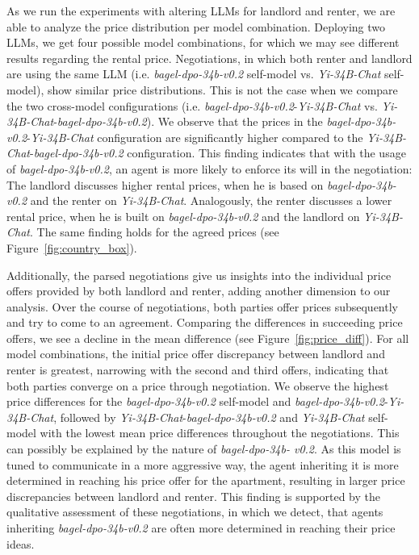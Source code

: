 \documentclass[runningheads]{llncs}
\begin{document}
As we run the experiments with altering LLMs for landlord and renter, we are able to analyze the price distribution per model combination. Deploying two LLMs, we get four possible model combinations, for which we may see different results regarding the rental price. Negotiations, in which both renter and landlord are using the same LLM (i.e. \textit{bagel-dpo-34b-v0.2} self-model vs. \textit{Yi-34B-Chat} self-model), show similar price distributions. This is not the case when we compare the two cross-model configurations (i.e. \textit{bagel-dpo-34b-v0.2}-\textit{Yi-34B-Chat} vs. \textit{Yi-34B-Chat}-\textit{bagel-dpo-34b-v0.2}). We observe that the prices in the \textit{bagel-dpo-34b-v0.2}-\textit{Yi-34B-Chat} configuration are significantly higher compared to the \textit{Yi-34B-Chat}-\textit{bagel-dpo-34b-v0.2} configuration. This finding indicates that with the usage of \textit{bagel-dpo-34b-v0.2}, an agent is more likely to enforce its will in the negotiation: The landlord discusses higher rental prices, when he is based on \textit{bagel-dpo-34b-v0.2} and the renter on \textit{Yi-34B-Chat}. Analogously, the renter discusses a lower rental price, when he is built on \textit{bagel-dpo-34b-v0.2} and the landlord on \textit{Yi-34B-Chat}. The same finding holds for the agreed prices (see Figure~\ref{fig:country_box}).

Additionally, the parsed negotiations give us insights into the individual price offers provided by both landlord and renter, adding another dimension to our analysis. Over the course of negotiations, both parties offer prices subsequently and try to come to an agreement. Comparing the differences in succeeding price offers, we see a decline in the mean difference (see Figure~\ref{fig:price_diff}). For all model combinations, the initial price offer discrepancy between landlord and renter is greatest, narrowing with the second and third offers, indicating that both parties converge on a price through negotiation. We observe the highest price differences for the \textit{bagel-dpo-34b-v0.2} self-model and \textit{bagel-dpo-34b-v0.2}-\textit{Yi-34B-Chat}, followed by \textit{Yi-34B-Chat}-\textit{bagel-dpo-34b-v0.2} and \textit{Yi-34B-Chat} self-model with the lowest mean price differences throughout the negotiations.
This can possibly be explained by the nature of \textit{bagel-dpo-34b-
v0.2}. As this model is tuned to communicate in a more aggressive way, the agent inheriting it is more determined in reaching his price offer for the apartment, resulting in larger price discrepancies between landlord and renter. This finding is supported by the qualitative assessment of these negotiations, in which we detect, that agents inheriting \textit{bagel-dpo-34b-v0.2} are often more determined in reaching their price ideas.
\end{document}
